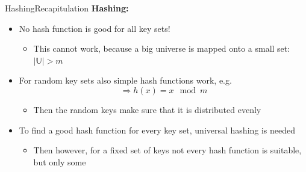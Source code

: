 

\begin{frame}{Hashing}{Recapitulation}
  \textbf{Hashing:}
  \begin{itemize}   
  \item<2->
    No hash function is good for all key sets!\\
    \begin{itemize}
    \item<3->
      This cannot work, because a big universe
      is mapped onto a small set: {\color{MainA}$\vert \mathbb{U} \vert > m$}
    \end{itemize}
  \item<4->
    For random key sets also simple hash functions work, e.g.
     {\color{MainA}\[\Rightarrow h(x) = x \mod m\]}\vspace*{-2em}
     \begin{itemize}
    \item<5->
      Then the random keys make sure that it is distributed evenly
     \end{itemize}
  \item<6->
   To find a good hash function for every key set, universal hashing is needed
     \begin{itemize}
    \item<7->
      Then however, for a fixed set of keys not every hash function is suitable,
      but only some
    \end{itemize}
  \end{itemize}
\end{frame}


